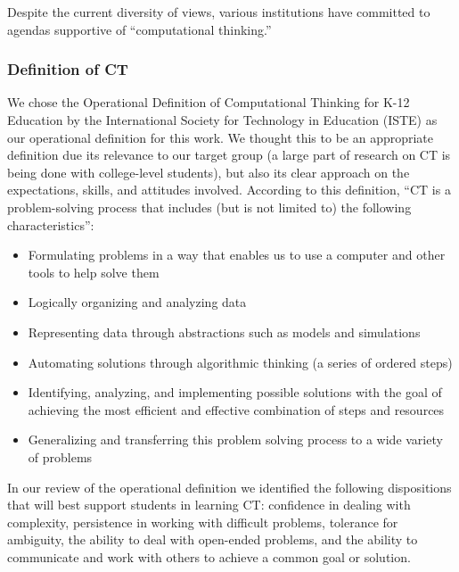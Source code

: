 \documentclass{acm_proc_article-sp}
\begin{document}
Despite the current diversity of views, various institutions have committed to agendas supportive of ``computational thinking.''

\subsubsection{Definition of CT}
We chose the Operational Definition of Computational Thinking for K-12 Education by the International Society for Technology in Education (ISTE) \cite{operationalct} as our operational definition for this work. 
We thought this to be an appropriate definition due its relevance to our target group (a large part of research on CT is being done with college-level students), but also its clear approach on the expectations, skills, and attitudes involved. 
According to this definition, ``CT is a problem-solving process that includes (but is not limited to) the following characteristics'': 
\begin{itemize}
  \item{Formulating problems in a way that enables us to use a computer and other tools to help solve them}
  \item{Logically organizing and analyzing data}
  \item{Representing data through abstractions such as models and simulations}
  \item{Automating solutions through algorithmic thinking (a series of ordered steps)}
  \item{Identifying, analyzing, and implementing possible solutions with the goal of achieving the most efficient and effective combination of steps and resources}
  \item{Generalizing and transferring this problem solving process to a wide variety of problems}
\end{itemize}

In our review of the operational definition we identified the following dispositions that will best support students in learning CT: confidence in dealing with complexity, persistence in working with difficult problems, tolerance for ambiguity, the ability to deal with open-ended problems, and the ability to communicate and work with others to achieve a common goal or solution.
\end{document}
